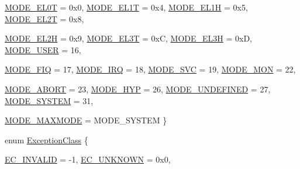 \begin{DoxyCompactItemize}
\hyperlink{namespaceArmISA_ae306b3353ed3d62bb2e6de130b3c9eaaa92235269a272456ac75eaa8bab2e3c1b}{MODE\_\-EL0T} =  0x0, 
\hyperlink{namespaceArmISA_ae306b3353ed3d62bb2e6de130b3c9eaaa2b4ce5d3312a1c74faf2cee1294604e3}{MODE\_\-EL1T} =  0x4, 
\hyperlink{namespaceArmISA_ae306b3353ed3d62bb2e6de130b3c9eaaaa3ae30a3e461968b3ffeee4770b7b42a}{MODE\_\-EL1H} =  0x5, 
\hyperlink{namespaceArmISA_ae306b3353ed3d62bb2e6de130b3c9eaaaa89f12e5bc3870720bae90bbdebfbe20}{MODE\_\-EL2T} =  0x8, 
\par
\hyperlink{namespaceArmISA_ae306b3353ed3d62bb2e6de130b3c9eaaa1e8710c38a364f4c007e24d487525eca}{MODE\_\-EL2H} =  0x9, 
\hyperlink{namespaceArmISA_ae306b3353ed3d62bb2e6de130b3c9eaaaff7394180f8bffb5d94cc12b3698946b}{MODE\_\-EL3T} =  0xC, 
\hyperlink{namespaceArmISA_ae306b3353ed3d62bb2e6de130b3c9eaaad9168a023d16808e67ae8b9fb7c039b9}{MODE\_\-EL3H} =  0xD, 
\hyperlink{namespaceArmISA_ae306b3353ed3d62bb2e6de130b3c9eaaa06c431ef2d3daa0430be10958afb75da}{MODE\_\-USER} =  16, 
\par
\hyperlink{namespaceArmISA_ae306b3353ed3d62bb2e6de130b3c9eaaa114f4eed33e46c8994d1c28ea790ae69}{MODE\_\-FIQ} =  17, 
\hyperlink{namespaceArmISA_ae306b3353ed3d62bb2e6de130b3c9eaaa6ff5fe07fb1563cee773d932bb66d9b7}{MODE\_\-IRQ} =  18, 
\hyperlink{namespaceArmISA_ae306b3353ed3d62bb2e6de130b3c9eaaad0b02e29561c3d3e1c2c919fb8baa17a}{MODE\_\-SVC} =  19, 
\hyperlink{namespaceArmISA_ae306b3353ed3d62bb2e6de130b3c9eaaa5cb887fd4bf61d41bdf6b2d617d9fb33}{MODE\_\-MON} =  22, 
\par
\hyperlink{namespaceArmISA_ae306b3353ed3d62bb2e6de130b3c9eaaa6258e223348908f6ceefcfe029aba214}{MODE\_\-ABORT} =  23, 
\hyperlink{namespaceArmISA_ae306b3353ed3d62bb2e6de130b3c9eaaa1978fe9b066f3cfc8ad44f06e8a0e199}{MODE\_\-HYP} =  26, 
\hyperlink{namespaceArmISA_ae306b3353ed3d62bb2e6de130b3c9eaaa6c9ee0fa90f09f791c2b50805b049ed3}{MODE\_\-UNDEFINED} =  27, 
\hyperlink{namespaceArmISA_ae306b3353ed3d62bb2e6de130b3c9eaaa3089ec4290f4fd2378a9843e275e679d}{MODE\_\-SYSTEM} =  31, 
\par
\hyperlink{namespaceArmISA_ae306b3353ed3d62bb2e6de130b3c9eaaac25408f7597dfa5f4b1c880146f6436a}{MODE\_\-MAXMODE} =  MODE\_\-SYSTEM
 \}
\item 
enum \hyperlink{namespaceArmISA_a04034d12009cf36227f4d2abff3331a2}{ExceptionClass} \{ \par
\hyperlink{namespaceArmISA_a04034d12009cf36227f4d2abff3331a2aa3995628917a586c043ca2d5933b0149}{EC\_\-INVALID} =  -\/1, 
\hyperlink{namespaceArmISA_a04034d12009cf36227f4d2abff3331a2a230d22d3c096db888df52a0e5d5ba7ac}{EC\_\-UNKNOWN} =  0x0, 

\end{DoxyCompactItemize}
